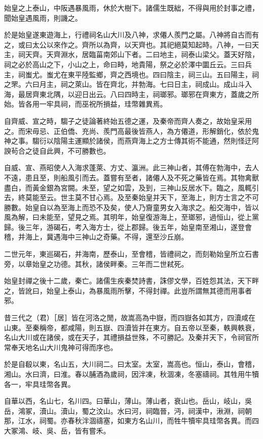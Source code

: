 始皇之上泰山，中阪遇暴風雨，休於大樹下。諸儒生既絀，不得與用於封事之禮，聞始皇遇風雨，則譏之。

於是始皇遂東遊海上，行禮祠名山大川及八神，求僊人羨門之屬。八神將自古而有之，或曰太公以來作之。齊所以為齊，以天齊也。其祀絕莫知起時。八神，一曰天主，祠天齊。天齊淵水，居臨菑南郊山下者。二曰地主，祠泰山梁父。蓋天好陰，祠之必於高山之下，小山之上，命曰畤，地貴陽，祭之必於澤中圜丘云。三曰兵主，祠蚩尤。蚩尤在東平陸監鄉，齊之西境也。四曰陰主，祠三山。五曰陽主，祠之罘。六曰月主，祠之萊山。皆在齊北，并勃海。七曰日主，祠成山。成山斗入海，最居齊東北隅，以迎日出云。八曰四時主，祠瑯邪。瑯邪在齊東方，蓋歲之所始。皆各用一牢具祠，而巫祝所損益，珪幣雜異焉。

自齊威、宣之時，騶子之徒論著終始五德之運，及秦帝而齊人奏之，故始皇采用之。而宋毋忌、正伯僑、充尚、羨門高最後皆燕人，為方僊道，形解銷化，依於鬼神之事。騶衍以陰陽主運顯於諸侯，而燕齊海上之方士傳其術不能通，然則怪迂阿諛茍合之徒自此興，不可勝數也。

自威、宣、燕昭使人入海求蓬萊、方丈、瀛洲。此三神山者，其傅在勃海中，去人不遠，患且至，則船風引而去。蓋嘗有至者，諸僊人及不死之藥皆在焉。其物禽獸盡白，而黃金銀為宮闕。未至，望之如雲，及到，三神山反居水下。臨之，風輒引去，終莫能至云。世主莫不甘心焉。及至秦始皇并天下，至海上，則方士言之不可勝數。始皇自以為至海上而恐不及矣，使人乃齎童男女入海求之。船交海中，皆以風為解，曰未能至，望見之焉。其明年，始皇復游海上，至瑯邪，過恒山，從上黨歸。後三年，游碣石，考入海方士，從上郡歸。後五年，始皇南至湘山，遂登會稽，并海上，冀遇海中三神山之奇藥。不得，還至沙丘崩。

二世元年，東巡碣石，并海南，歷泰山，至會稽，皆禮祠之，而刻勒始皇所立石書旁，以章始皇之功德。其秋，諸侯畔秦。三年而二世弒死。

始皇封禪之後十二歲，秦亡。諸儒生疾秦焚詩書，誅僇文學，百姓怨其法，天下畔之，皆訛曰，始皇上泰山，為暴風雨所擊，不得封禪。此豈所謂無其德而用事者邪。

昔三代之（君）［居］皆在河洛之閒，故嵩高為中嶽，而四嶽各如其方，四瀆咸在山東。至秦稱帝，都咸陽，則五嶽、四瀆皆并在東方。自五帝以至秦，軼興軼衰，名山大川或在諸侯，或在天子，其禮損益世殊，不可勝記。及秦并天下，令祠官所常奉天地名山大川鬼神可得而序也。

於是自殽以東，名山五，大川祠二。曰太室。太室，嵩高也。恒山，泰山，會稽，湘山。水曰濟，曰淮。春以脯酒為歲祠，因泮凍，秋涸凍，冬塞禱祠。其牲用牛犢各一，牢具珪幣各異。

自華以西，名山七，名川四。曰華山，薄山。薄山者，衰山也。岳山，岐山，吳岳，鴻冢，瀆山。瀆山，蜀之汶山。水曰河，祠臨晉，沔，祠漢中，湫淵，祠朝那，江水，祠蜀。亦春秋泮涸禱塞，如東方名山川，而牲牛犢牢具珪幣各異。而四大冢鴻、岐、吳、岳，皆有嘗禾。

